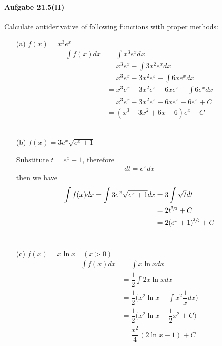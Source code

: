 \documentclass[11pt,a4paper]{article}
\renewcommand{\frac}{\dfrac}
\begin{document}
\newpage

\paragraph{Aufgabe 21.5(H)}

Calculate antiderivative of following functions with proper methods:

\begin{enumerate}

\item[(a)]$f(x)=x^3e^x$
\begin{align}
\int f(x)dx
&=\int x^3e^x dx \\
&=x^3e^x-\int 3x^2e^x dx \\
&=x^3e^x-3x^2e^x+\int 6xe^x dx \\
&=x^3e^x-3x^2e^x+6xe^x-\int 6e^x dx \\
&=x^3e^x-3x^2e^x+6xe^x-6e^x+C \\
&=(x^3-3x^2+6x-6)e^x+C
\end{align}\\

\item[(b)]$f(x)=3e^x\sqrt{e^x+1}$

Substitute $t=e^x+1$, therefore
\begin{align}
dt=e^xdx
\end{align}
then we have
\begin{align}
\int f(x)dx=\int 3e^x\sqrt{e^x+1}dx
&=3\int \sqrt{t}dt \\
&=2t^{\sfrac{3}{2}}+C \\
&=2(e^x+1)^{\sfrac{3}{2}}+C
\end{align}
\\

\item[(c)]$f(x)=x\ln x \hspace{1em} (x>0)$
\begin{align}
\int f(x)dx
&=\int x\ln x dx \\
&=\frac{1}{2} \int 2x\ln x dx \\
&=\frac{1}{2}\bigg(x^2\ln x-\int x^2\frac{1}{x}dx\bigg) \\
&=\frac{1}{2}\bigg(x^2\ln x-\frac{1}{2}x^2+C\bigg) \\
&=\frac{x^2}{4}(2\ln x-1)+C
\end{align}

\newpage


\end{enumerate}
\end{document}
